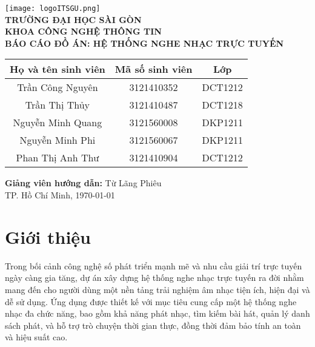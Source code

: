 \documentclass[a4paper,12pt]{report}
\begin{document}
\begin{titlepage}
    \centering
    \texttt{[image: logoITSGU.png]} \\[1cm]
    \textbf{\Large TRƯỜNG ĐẠI HỌC SÀI GÒN} \\[0.5cm]
    \textbf{\Large KHOA CÔNG NGHỆ THÔNG TIN} \\[2cm]
    {\Huge \textbf{BÁO CÁO ĐỒ ÁN: HỆ THỐNG NGHE NHẠC TRỰC TUYẾN}} \\[2cm]

    \begin{center}
        \begin{tabular}{|c|c|c|}
            \hline
            \textbf{Họ và tên sinh viên} & \textbf{Mã số sinh viên} & \textbf{Lớp} \\
            \hline
            Trần Công Nguyên & 3121410352 & DCT1212 \\
            \hline
            Trần Thị Thủy & 3121410487 & DCT1218 \\
            \hline
            Nguyễn Minh Quang & 3121560008 & DKP1211 \\
            \hline
            Nguyễn Minh Phi & 3121560067 & DKP1211 \\
            \hline
            Phan Thị Anh Thư & 3121410904 & DCT1212 \\
            \hline
        \end{tabular}
    \end{center}

    \vspace{1cm}
    \textbf{Giảng viên hướng dẫn:} Từ Lãng Phiêu \\

    \vfill
    TP. Hồ Chí Minh, \today
\end{titlepage}

\newpage
\tableofcontents
\newpage


\chapter{Giới thiệu}
Trong bối cảnh công nghệ số phát triển mạnh mẽ và nhu cầu giải trí trực tuyến ngày càng gia tăng, dự án xây dựng hệ thống nghe nhạc trực tuyến ra đời nhằm mang đến cho người dùng một nền tảng trải nghiệm âm nhạc tiện ích, hiện đại và dễ sử dụng. Ứng dụng được thiết kế với mục tiêu cung cấp một hệ thống nghe nhạc đa chức năng, bao gồm khả năng phát nhạc, tìm kiếm bài hát, quản lý danh sách phát, và hỗ trợ trò chuyện thời gian thực, đồng thời đảm bảo tính an toàn và hiệu suất cao.
\end{document}
